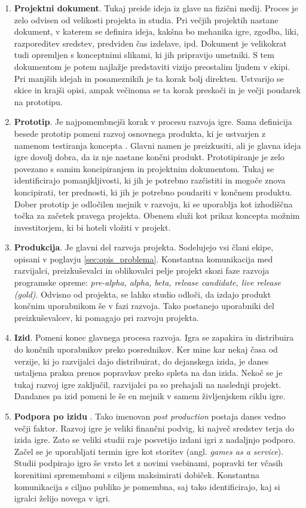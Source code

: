 \documentclass[12pt,a4paper,twoside]{book}
\begin{document}
\begin{enumerate}
	\item \textbf{Projektni dokument}. Tukaj preide ideja iz glave na fizični medij. Proces je zelo odvisen od velikosti projekta in studia. Pri večjih projektih nastane dokument, v katerem se definira ideja, kakšna bo mehanika igre, zgodba, liki, razporeditev sredstev, predviden čas izdelave, ipd. Dokument je velikokrat tudi opremljen s konceptnimi slikami, ki jih pripravijo umetniki. S tem dokumentom je potem najlažje predstaviti vizijo preostalim ljudem v ekipi. Pri manjših idejah in posameznikih je ta korak bolj direkten. Ustvarijo se skice in krajši opisi, ampak večinoma se ta korak preskoči in je večji poudarek na prototipu.
	\item \textbf{Prototip}. Je najpomembnejši korak v procesu razvoja igre. Sama definicija besede prototip pomeni razvoj osnovnega produkta, ki je ustvarjen z namenom testiranja koncepta \cite{blackwell2015prototype}. Glavni namen je preizkusiti, ali je glavna ideja igre dovolj dobra, da iz nje nastane končni produkt. Prototipiranje je zelo povezano s samim koncipiranjem in projektnim dokumentom. Tukaj se identificirajo pomanjkljivosti, ki jih je potrebno razčistiti in mogoče znova koncipirati, ter prednosti, ki jih je potrebno poudariti v končnem produktu. Dober prototip je odločilen mejnik v razvoju, ki se uporablja kot izhodiščna točka za začetek pravega projekta. Obenem služi kot prikaz koncepta možnim investitorjem, ki bi hoteli vložiti v projekt. 
	\item \textbf{Produkcija}. Je glavni del razvoja projekta. Sodelujejo vsi člani ekipe, opisani v poglavju \ref{sec:opis_problema}. Konstantna komunikacija med razvijalci, preizkuševalci in oblikovalci pelje projekt skozi faze razvoja programske opreme: \textit{pre-alpha, alpha, beta, release candidate, live release (gold)}. Odvisno od projekta, se lahko studio odloči, da izdajo produkt končnim uporabnikom še v fazi razvoja. Tako postanejo uporabniki del preizkuševalcev, ki pomagajo pri razvoju projekta.
	\item \textbf{Izid}. Pomeni konec glavnega procesa razvoja. Igra se zapakira in distribuira do končnih uporabnikov preko posrednikov. Ker mine kar nekaj časa od verzije, ki jo razvijalci dajo distribuirat, do dejanskega izida, je danes ustaljena praksa prenos popravkov preko spleta na dan izida. Nekoč se je tukaj razvoj igre zaključil, razvijalci pa so prehajali na naslednji projekt. Dandanes pa izid pomeni le še en mejnik v samem življenjskem ciklu igre.
	\item \textbf{Podpora po izidu} . Tako imenovan \textit{post production} postaja danes vedno večji faktor. Razvoj igre je veliki finančni podvig, ki največ sredstev terja do izida igre. Zato se veliki studii raje posvetijo izdani igri z nadaljnjo podporo. Začel se je uporabljati termin igre kot storitev (angl. \textit{games as a service}). Studii podpirajo igro še vrsto let z novimi vsebinami, popravki ter včasih korenitimi spremembami s ciljem maksimirati dobiček. Konstantna komunikacija s ciljno publiko je pomembna, saj tako identificirajo, kaj si igralci želijo novega v igri.
\end{enumerate}
\end{document}
